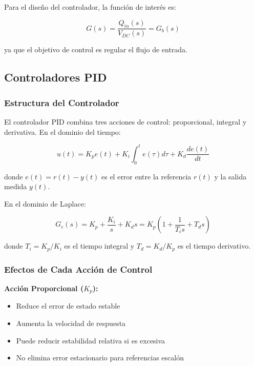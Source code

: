 \documentclass[conference]{IEEEtran}
\begin{document}
Para el diseño del controlador, la función de interés es:

\begin{equation}
G(s) = \frac{Q_{in}(s)}{V_{DC}(s)} = G_b(s)
\label{eq:tf_control}
\end{equation}

ya que el objetivo de control es regular el flujo de entrada.

\subsection{Controladores PID}

\subsubsection{Estructura del Controlador}

El controlador PID combina tres acciones de control: proporcional, integral y derivativa. En el dominio del tiempo:

\begin{equation}
u(t) = K_p e(t) + K_i \int_0^t e(\tau)d\tau + K_d \frac{de(t)}{dt}
\label{eq:pid_tiempo}
\end{equation}

donde $e(t) = r(t) - y(t)$ es el error entre la referencia $r(t)$ y la salida medida $y(t)$.

En el dominio de Laplace:

\begin{equation}
G_c(s) = K_p + \frac{K_i}{s} + K_d s = K_p\left(1 + \frac{1}{T_i s} + T_d s\right)
\label{eq:pid_laplace}
\end{equation}

donde $T_i = K_p/K_i$ es el tiempo integral y $T_d = K_d/K_p$ es el tiempo derivativo.

\subsubsection{Efectos de Cada Acción de Control}

\textbf{Acción Proporcional ($K_p$):}
\begin{itemize}
\item Reduce el error de estado estable
\item Aumenta la velocidad de respuesta
\item Puede reducir estabilidad relativa si es excesiva
\item No elimina error estacionario para referencias escalón
\end{itemize}
\end{document}
